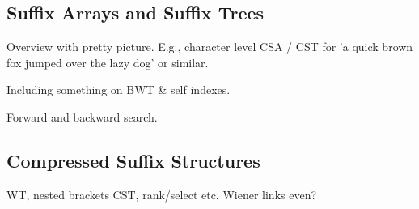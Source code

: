 
\subsection{Suffix Arrays and Suffix Trees}

Overview with pretty picture. E.g., character level CSA / CST for 
'a quick brown fox jumped over the lazy dog' or similar.

Including something on BWT \& self indexes.

Forward and backward search.

\subsection{Compressed Suffix Structures}

WT, nested brackets CST, rank/select etc. Wiener links even?
